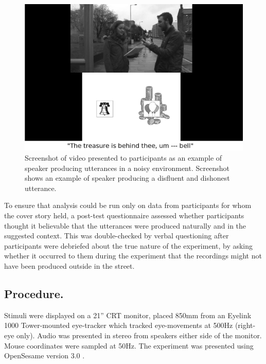 \documentclass[a4paper,man,natbib]{apa6}
\begin{document}
\begin{figure}[Ht]
  \centering
	\includegraphics[scale=.2]{convincer.png}
  \caption{Screenshot of video presented to participants as an example of speaker producing utterances in a noisy environment. Screenshot shows an example of speaker producing a disfluent and dishonest utterance.}
  \label{fig:vid}
\end{figure}

To ensure that analysis could be run only on data from participants for whom the cover story held, a post-test questionnaire assessed whether participants thought it believable that the utterances were produced naturally and in the suggested context. 
This was double-checked by verbal questioning after participants were debriefed about the true nature of the experiment, by asking whether it occurred to them during the experiment that the recordings might not have been produced outside in the street.\\

\subsection{Procedure.}
Stimuli were displayed on a 21'' CRT monitor, placed 850mm from an Eyelink 1000 Tower-mounted eye-tracker which tracked eye-movements at 500Hz (right-eye only). 
Audio was presented in stereo from speakers either side of the monitor. 
Mouse coordinates were sampled at 50Hz. 
The experiment was presented using OpenSesame version 3.0 \citep{Mathot2012}.\\
\end{document}
